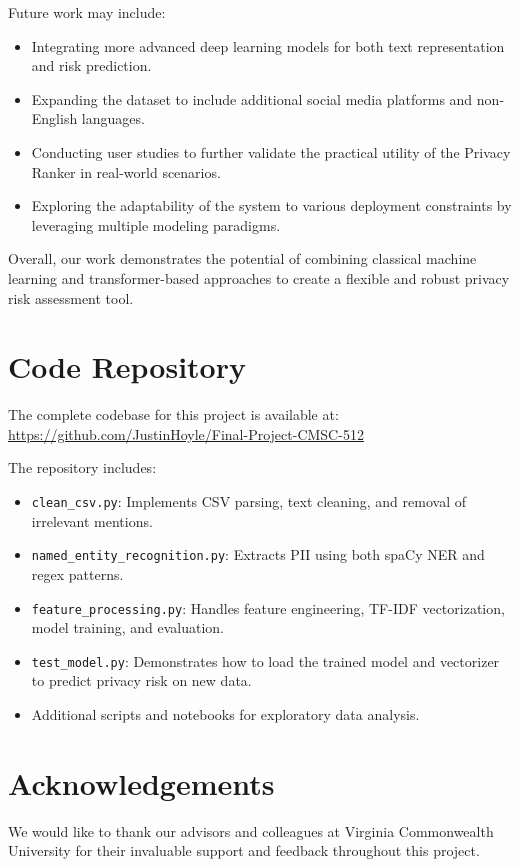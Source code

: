 \documentclass{article}
\begin{document}
Future work may include:
\begin{itemize}
    \item Integrating more advanced deep learning models for both text representation and risk prediction.
    \item Expanding the dataset to include additional social media platforms and non-English languages.
    \item Conducting user studies to further validate the practical utility of the Privacy Ranker in real-world scenarios.
    \item Exploring the adaptability of the system to various deployment constraints by leveraging multiple modeling paradigms.
\end{itemize}
Overall, our work demonstrates the potential of combining classical machine learning and transformer-based approaches to create a flexible and robust privacy risk assessment tool.

\section{Code Repository}
The complete codebase for this project is available at:
\url{https://github.com/JustinHoyle/Final-Project-CMSC-512}

The repository includes:
\begin{itemize}
    \item \texttt{clean\_csv.py}: Implements CSV parsing, text cleaning, and removal of irrelevant mentions.
    \item \texttt{named\_entity\_recognition.py}: Extracts PII using both spaCy NER and regex patterns.
    \item \texttt{feature\_processing.py}: Handles feature engineering, TF-IDF vectorization, model training, and evaluation.
    \item \texttt{test\_model.py}: Demonstrates how to load the trained model and vectorizer to predict privacy risk on new data.
    \item Additional scripts and notebooks for exploratory data analysis.
\end{itemize}

\section{Acknowledgements}
We would like to thank our advisors and colleagues at Virginia Commonwealth University for their invaluable support and feedback throughout this project.
\end{document}
